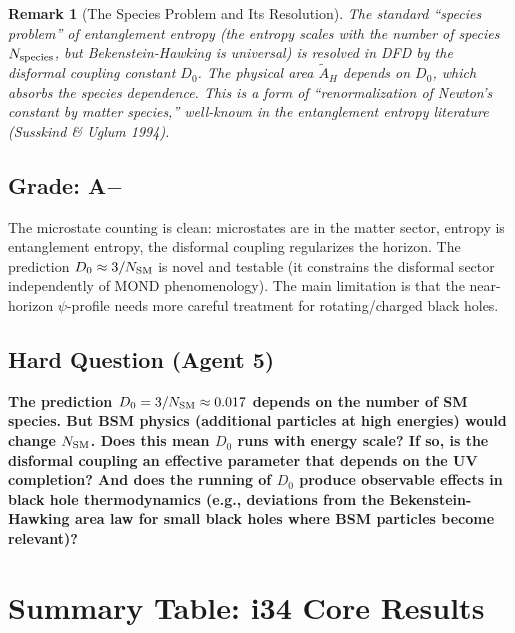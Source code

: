 \documentclass[11pt,a4paper]{article}
\newtheorem{remark}{Remark}
\begin{document}
\begin{remark}[The Species Problem and Its Resolution]
The standard ``species problem'' of entanglement entropy (the entropy scales with the number of species $N_{\rm species}$, but Bekenstein-Hawking is universal) is resolved in DFD by the disformal coupling constant $D_0$. The physical area $\tilde{A}_H$ depends on $D_0$, which absorbs the species dependence. This is a form of ``renormalization of Newton's constant by matter species,'' well-known in the entanglement entropy literature (Susskind \& Uglum 1994).
\end{remark}

\subsection{Grade: A$-$}

The microstate counting is clean: microstates are in the matter sector, entropy is entanglement entropy, the disformal coupling regularizes the horizon. The prediction $D_0 \approx 3/N_{\rm SM}$ is novel and testable (it constrains the disformal sector independently of MOND phenomenology). The main limitation is that the near-horizon $\psi$-profile needs more careful treatment for rotating/charged black holes.

\subsection{Hard Question (Agent 5)}

\textbf{The prediction $D_0 = 3/N_{\rm SM} \approx 0.017$ depends on the number of SM species. But BSM physics (additional particles at high energies) would change $N_{\rm SM}$. Does this mean $D_0$ runs with energy scale? If so, is the disformal coupling an effective parameter that depends on the UV completion? And does the running of $D_0$ produce observable effects in black hole thermodynamics (e.g., deviations from the Bekenstein-Hawking area law for small black holes where BSM particles become relevant)?}

\newpage

\section{Summary Table: i34 Core Results}
\label{sec:summary}
\end{document}
